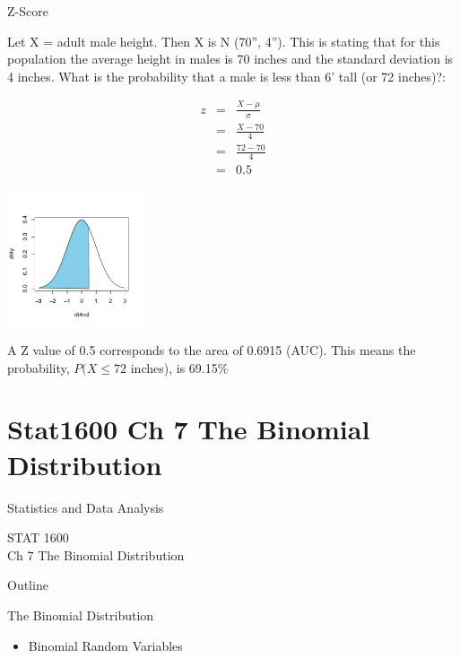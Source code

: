 \documentclass[14pt]{beamer}\usepackage[]{graphicx}\usepackage[]{color}
\begin{document}
\begin{frame}[fragile]{Z-Score}

{\footnotesize{
Let X = adult male height. Then X is N (70'', 4''). This is stating that  for this population the average height in males is 70 inches and the standard deviation is 4 inches.  What is the probability that a male is less than 6' tall (or 72 inches)?:  }}
 
\begin{minipage}[ht]{5cm}

{\footnotesize{
\begin{eqnarray*}
z &=& \frac{X - \mu}{\sigma} \\
  &=& \frac{X - 70}{4} \\
  &=& \frac{72 - 70}{4} \\
  &=& 0.5 
\end{eqnarray*}
}}
\end{minipage}
\begin{minipage}[ht]{4cm}


\includegraphics[width=4cm]{figure/LBL6b-1} 

\end{minipage}

{\footnotesize{
A Z value of 0.5 corresponds to the area of 0.6915 (AUC).  This means the probability, $P(X \le 72$ inches), is 69.15\%
}}
\end{frame}



\section{Stat1600 Ch 7 The Binomial Distribution}

\begin{frame}[fragile]{Statistics and Data Analysis}

STAT 1600 \\ Ch 7 The Binomial Distribution

\end{frame}

\begin{frame}[fragile]{Outline}

The Binomial Distribution  

\begin{itemize}
\item Binomial Random Variables
\end{itemize}
\end{frame}
\end{document}
